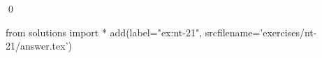 
\begin{ex} 
  \label{ex:nt-21}
  
  \qed
\end{ex} 
\begin{python0}
from solutions import *
add(label="ex:nt-21",
    srcfilename='exercises/nt-21/answer.tex') 
\end{python0}
